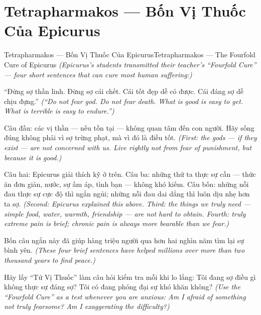 \section{Tetrapharmakos — Bốn Vị Thuốc Của Epicurus}
\begin{truyen}{Tetrapharmakos — Bốn Vị Thuốc Của Epicurus}{Tetrapharmakos — The Fourfold Cure of Epicurus}
\textit{(Epicurus's students transmitted their teacher's ``Fourfold Cure'' — four short sentences that can cure most human suffering:)}

``Đừng sợ thần linh. Đừng sợ cái chết. Cái tốt đẹp dễ có được. Cái đáng sợ dễ chịu đựng.''
\textit{(``Do not fear god. Do not fear death. What is good is easy to get. What is terrible is easy to endure.'')}

Câu đầu: các vị thần — nếu tồn tại — không quan tâm đến con người. Hãy sống đúng không phải vì sợ trừng phạt, mà vì đó là điều tốt.
\textit{(First: the gods — if they exist — are not concerned with us. Live rightly not from fear of punishment, but because it is good.)}

Câu hai: Epicurus giải thích kỹ ở trên. Câu ba: những thứ ta thực sự cần — thức ăn đơn giản, nước, sự ấm áp, tình bạn — không khó kiếm. Câu bốn: những nỗi đau thực sự cực độ thì ngắn ngủi; những nỗi đau dai dẳng thì luôn dịu nhẹ hơn ta sợ.
\textit{(Second: Epicurus explained this above. Third: the things we truly need — simple food, water, warmth, friendship — are not hard to obtain. Fourth: truly extreme pain is brief; chronic pain is always more bearable than we fear.)}

Bốn câu ngắn này đã giúp hàng triệu người qua hơn hai nghìn năm tìm lại sự bình yên.
\textit{(These four brief sentences have helped millions over more than two thousand years to find peace.)}

\end{truyen}

\begin{baihoc}
Hãy lấy ``Tứ Vị Thuốc'' làm câu hỏi kiểm tra mỗi khi lo lắng: Tôi đang sợ điều gì không thực sự đáng sợ? Tôi có đang phóng đại sự khó khăn không?
\textit{(Use the ``Fourfold Cure'' as a test whenever you are anxious: Am I afraid of something not truly fearsome? Am I exaggerating the difficulty?)}
\end{baihoc}
